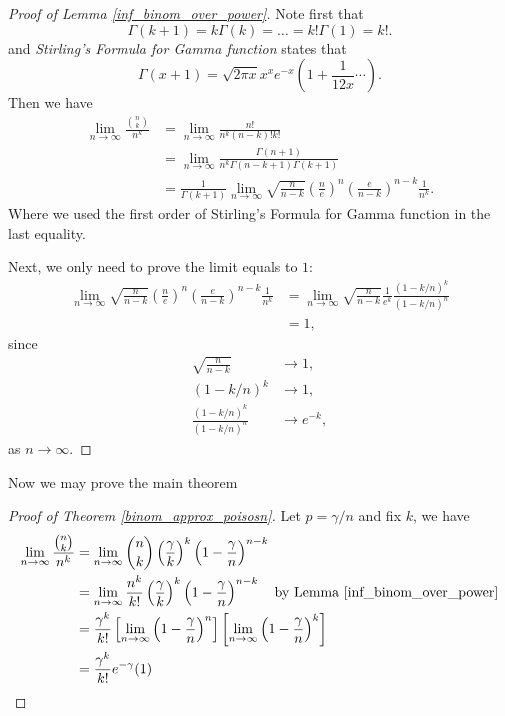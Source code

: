 \documentclass[10pt]{article}
\theoremstyle{remark}
\theoremstyle{plain}
\numberwithin{equation}{section}
\begin{document}
\begin{proof}[Proof of Lemma \ref{inf_binom_over_power}]
	Note first that
		\[
			\Gamma(k+1) = k \Gamma(k) = \dots = k!\Gamma(1) = k!.
		\]
	and \textit{Stirling's Formula for Gamma function} states that
		\[
			\Gamma(x+1) = \sqrt{2\pi x} x^x e^{-x} \left(1 + \frac{1}{12x} \cdots \right).
		\]
	Then we have
	\begin{align*}
		\lim_{n \to \infty} \frac{\binom{n}{k}}{n^k} & = \lim_{n \to \infty} \frac{n!}{n^k (n-k)! k!}
		\\
		& =  \lim_{n \to \infty} \frac{\Gamma(n+1)}{n^k \Gamma(n-k+1) \Gamma(k+1)}
		\\
		& =  \frac{1}{\Gamma(k+1)}\lim_{n \to \infty} \sqrt{\frac{n}{n-k}} \left(\frac{n}{e}\right)^n \left(\frac{e}{n-k}\right)^{n-k} \frac{1}{n^k}.
	\end{align*}
	Where we used the first order of Stirling's Formula for Gamma function in the last equality.
	
	Next, we only need to prove the limit equals to $1$:
	\begin{align*}
		\lim_{n \to \infty} \sqrt{\frac{n}{n-k}} \left(\frac{n}{e}\right)^n \left(\frac{e}{n-k}\right)^{n-k} \frac{1}{n^k} & = \lim_{n \to \infty} \sqrt{\frac{n}{n-k}} \frac{1}{e^k} \frac{(1-k/n)^k}{(1-k/n)^n}
		\\
		& = 1, 
	\end{align*}
	since
	\begin{align*}
		\sqrt{\frac{n}{n-k}} & \to 1,\\
		(1-k/n)^k &\to 1,\\
		\frac{(1-k/n)^k}{(1-k/n)^n} &\to e^{-k},
	\end{align*}
	as $n \to \infty$.
\end{proof}
Now we may prove the main theorem
\begin{proof}[Proof of Theorem \ref{binom_approx_poisosn}]
	Let $ p = \gamma/n$ and fix $k$, we have
	\begin{align*}
		\lim_{n \to \infty} \frac{\binom{n}{k}}{n^k} & = \lim_{n \to \infty} \binom{n}{k} \left(\frac{\gamma}{k}\right)^k\left(1 - \frac{\gamma}{n}\right)^{n-k}
		\\
		& = \lim_{n \to \infty} \frac{n^k}{k!} \left(\frac{\gamma}{k}\right)^k \left( 1 - \frac{\gamma}{n} \right)^{n-k} \quad \text{by Lemma \ref{inf_binom_over_power}}
		\\
		& = \frac{\gamma^k}{k!} \left[ \lim_{n \to \infty} \left(1 - \frac{\gamma}{n}\right)^n \right] \left[\lim_{n \to \infty} \left(1 - \frac{\gamma}{n}\right)^k \right]
		\\
		& = \frac{\gamma^k}{k!} e^{-\gamma} ( 1)
	\end{align*}
\end{proof}
\end{document}
